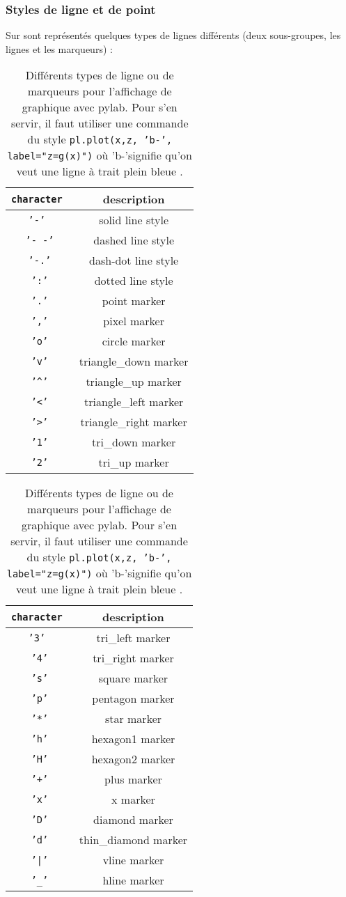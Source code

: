 \documentclass[a4paper,twoside]{article}
\begin{document}
\subsubsection{Styles de ligne et de point}\label{sec:linestyle}
Sur  sont représentés quelques types de lignes différents (deux sous-groupes, les lignes et les marqueurs) : 
\begin{table}[htb]
\hfill
\begin{tabular}{|>{\tt}c<{}|c|}
\hline
character & description\\\hline
'-' & solid line style\\\hline
'-~-' & dashed line style\\\hline
'-.' & dash-dot line style\\\hline
':' & dotted line style\\\hline
'.' & point marker\\\hline
',' & pixel marker\\\hline
'o' & circle marker\\\hline
'v' & triangle\_down marker\\\hline
'\textasciicircum' & triangle\_up marker\\\hline
'<' & triangle\_left marker\\\hline
'>' & triangle\_right marker\\\hline
'1' & tri\_down marker\\\hline
'2' & tri\_up marker\\\hline
\end{tabular}
\hfill
\begin{tabular}{|>{\tt}c<{}|c|}
\hline
character & description\\\hline
'3' & tri\_left marker\\\hline
'4' & tri\_right marker\\\hline
's' & square marker\\\hline
'p' & pentagon marker\\\hline
'*' & star marker\\\hline
'h' & hexagon1 marker\\\hline
'H' & hexagon2 marker\\\hline
'+' & plus marker\\\hline
'x' & x marker\\\hline
'D' & diamond marker\\\hline
'd' & thin\_diamond marker\\\hline
'|' & vline marker\\\hline
'\_' & hline marker\\\hline
\end{tabular}\hfill~

\caption{Différents types de ligne ou de marqueurs pour l'affichage de graphique avec pylab. Pour s'en servir, il faut utiliser une commande du style \texttt{pl.plot(x,z, 'b-', label="z=g(x)")} où \og 'b-'\fg signifie qu'on veut une ligne à trait plein bleue .}\label{tab:type_ligne}
\end{table}
\end{document}
